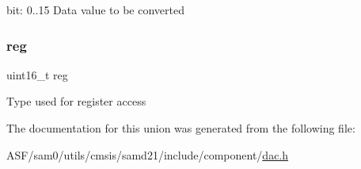bit\+: 0..15 Data value to be converted \mbox{\label{union_d_a_c___d_a_t_a___type_a11760f5020019f4aa8cb02e694f7cc44}} 
\subsubsection{\texorpdfstring{reg}{reg}}
{\footnotesize\ttfamily uint16\+\_\+t reg}

Type used for register access 

The documentation for this union was generated from the following file\+:\begin{DoxyCompactItemize}
\item 
A\+S\+F/sam0/utils/cmsis/samd21/include/component/\mbox{\hyperlink{component_2dac_8h}{dac.\+h}}\end{DoxyCompactItemize}
